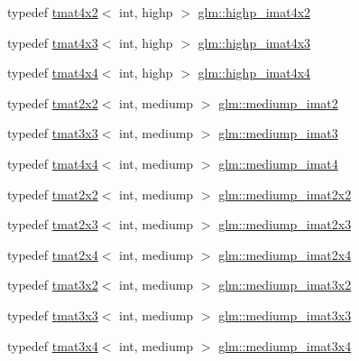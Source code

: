 \begin{DoxyCompactItemize}
typedef \hyperlink{structglm_1_1tmat4x2}{tmat4x2}$<$ int, highp $>$ \hyperlink{group__gtc__matrix__integer_ga7b936ac315e12b546d2597a4bffee4a1}{glm\+::highp\+\_\+imat4x2}
\item 
typedef \hyperlink{structglm_1_1tmat4x3}{tmat4x3}$<$ int, highp $>$ \hyperlink{group__gtc__matrix__integer_ga28e21d3fe05d8476402e27081150cade}{glm\+::highp\+\_\+imat4x3}
\item 
typedef \hyperlink{structglm_1_1tmat4x4}{tmat4x4}$<$ int, highp $>$ \hyperlink{group__gtc__matrix__integer_ga2a80b8ab686297145ecf713699233114}{glm\+::highp\+\_\+imat4x4}
\item 
typedef \hyperlink{structglm_1_1tmat2x2}{tmat2x2}$<$ int, mediump $>$ \hyperlink{group__gtc__matrix__integer_gae812330b83568359273b6ec96b002863}{glm\+::mediump\+\_\+imat2}
\item 
typedef \hyperlink{structglm_1_1tmat3x3}{tmat3x3}$<$ int, mediump $>$ \hyperlink{group__gtc__matrix__integer_gab033bd6a2bfebb1aa35d458c6f077ccb}{glm\+::mediump\+\_\+imat3}
\item 
typedef \hyperlink{structglm_1_1tmat4x4}{tmat4x4}$<$ int, mediump $>$ \hyperlink{group__gtc__matrix__integer_ga680c97868de08658ca4924718d951def}{glm\+::mediump\+\_\+imat4}
\item 
typedef \hyperlink{structglm_1_1tmat2x2}{tmat2x2}$<$ int, mediump $>$ \hyperlink{group__gtc__matrix__integer_ga52a40f2f95562746fd8084726a300963}{glm\+::mediump\+\_\+imat2x2}
\item 
typedef \hyperlink{structglm_1_1tmat2x3}{tmat2x3}$<$ int, mediump $>$ \hyperlink{group__gtc__matrix__integer_ga07314e9f05b82367570ca44c3ef7c0a7}{glm\+::mediump\+\_\+imat2x3}
\item 
typedef \hyperlink{structglm_1_1tmat2x4}{tmat2x4}$<$ int, mediump $>$ \hyperlink{group__gtc__matrix__integer_ga944a139f15de6bc12e9c7bf615ffc4f5}{glm\+::mediump\+\_\+imat2x4}
\item 
typedef \hyperlink{structglm_1_1tmat3x2}{tmat3x2}$<$ int, mediump $>$ \hyperlink{group__gtc__matrix__integer_ga8f682b5b64e2072c0729409ee6bfe2af}{glm\+::mediump\+\_\+imat3x2}
\item 
typedef \hyperlink{structglm_1_1tmat3x3}{tmat3x3}$<$ int, mediump $>$ \hyperlink{group__gtc__matrix__integer_gab4c647321a342c58119144ad08c6c406}{glm\+::mediump\+\_\+imat3x3}
\item 
typedef \hyperlink{structglm_1_1tmat3x4}{tmat3x4}$<$ int, mediump $>$ \hyperlink{group__gtc__matrix__integer_ga721a754fc35cc5ac097e331d893a6b2c}{glm\+::mediump\+\_\+imat3x4}
\item 

\end{DoxyCompactItemize}
